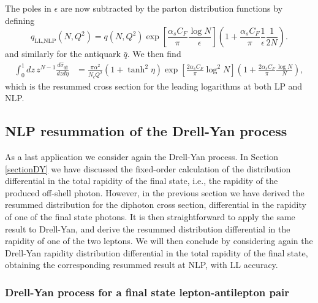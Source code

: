 \documentclass[11pt]{article}
\begin{document}
The poles in $\epsilon$ are now subtracted by the parton distribution functions by defining
\begin{equation}
    q_\text{LL,NLP}(N,Q^2) = q(N,Q^2)\exp\left[\frac{\alpha_sC_F}{\pi}\frac{\log N}{\epsilon}\right]\left(1+\frac{\alpha_sC_F}{\pi}\frac{1}{\epsilon}\frac{1}{2N}\right).
\end{equation}
and similarly for the antiquark $\bar{q}$. We then find 
\begin{align}\label{diphotonresummed}
    \int_0^1dz \, z^{N-1}\frac{d\hat{\sigma}_{q\bar{q}}}{dz d\eta} &= \frac{\pi\alpha^2}{N_c Q^2}(1+\tanh^2\eta)\exp\left[\frac{2\alpha_s C_F}{\pi}\log^2N\right]\left(1+\frac{2\alpha_sC_F}{\pi}\frac{\log N}{N}\right),
\end{align}
which is the resummed cross section for the leading logarithms at both LP and NLP.


\subsection{NLP resummation of the Drell-Yan process}\label{sectionDYresum}

As a last application we consider again the Drell-Yan process. 
In Section \ref{sectionDY} we have discussed the fixed-order calculation of the distribution differential in the total 
rapidity of the final state, i.e., the rapidity of the 
produced off-shell photon. However, in the previous section we have derived the resummed distribution for the diphoton cross  section, differential in the rapidity of one of the final state photons. It is then straightforward to apply the same result to Drell-Yan, and derive the resummed distribution differential in the rapidity of one of the two leptons. We will then conclude by considering again the Drell-Yan rapidity distribution differential in the total rapidity of the final state, obtaining the corresponding resummed result at NLP, with LL accuracy.


\subsubsection{Drell-Yan process for a final state lepton-antilepton pair}
\end{document}
